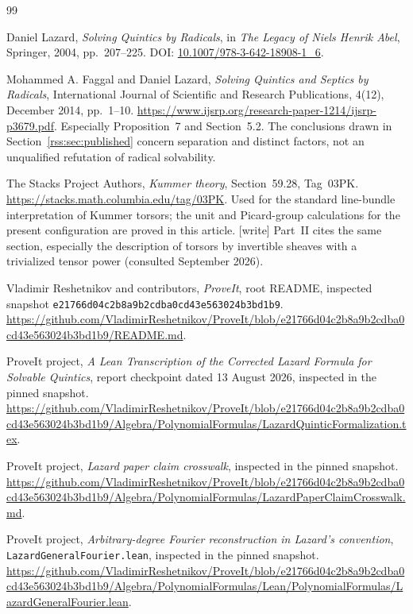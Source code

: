 \documentclass[11pt,a4paper]{article}
\theoremstyle{definition}
\theoremstyle{remark}
\newcommand{\code}[1]{{\small\nolinkurl{#1}}}
\newcommand{\snapshot}{\nolinkurl{e21766d04c2b8a9b2cdba0cd43e563024b3bd1b9}}
\begin{document}
\begin{thebibliography}{99}

Daniel Lazard,
\emph{Solving Quintics by Radicals},
in \emph{The Legacy of Niels Henrik Abel}, Springer, 2004, pp.~207--225.
DOI: \href{https://doi.org/10.1007/978-3-642-18908-1_6}{10.1007/978-3-642-18908-1\_6}.

Mohammed A. Faggal and Daniel Lazard,
\emph{Solving Quintics and Septics by Radicals},
International Journal of Scientific and Research Publications,
4(12), December 2014, pp.~1--10.
\url{https://www.ijsrp.org/research-paper-1214/ijsrp-p3679.pdf}.
Especially Proposition~7 and Section~5.2. The conclusions drawn in
Section~\ref{rss:sec:published} concern separation and distinct factors, not an
unqualified refutation of radical solvability.

The Stacks Project Authors,
\emph{Kummer theory}, Section~59.28, Tag~03PK.
\url{https://stacks.math.columbia.edu/tag/03PK}.
Used for the standard line-bundle interpretation of Kummer torsors; the
unit and Picard-group calculations for the present configuration are
proved in this article.
[write] Part~II cites the same section, especially the description of
torsors by invertible sheaves with a trivialized tensor power (consulted
September 2026).

Vladimir Reshetnikov and contributors,
\emph{ProveIt}, root README, inspected snapshot
\snapshot.
\url{https://github.com/VladimirReshetnikov/ProveIt/blob/e21766d04c2b8a9b2cdba0cd43e563024b3bd1b9/README.md}.

ProveIt project,
\emph{A Lean Transcription of the Corrected Lazard Formula for Solvable
Quintics}, report checkpoint dated 13 August 2026, inspected in the pinned
snapshot.
\url{https://github.com/VladimirReshetnikov/ProveIt/blob/e21766d04c2b8a9b2cdba0cd43e563024b3bd1b9/Algebra/PolynomialFormulas/LazardQuinticFormalization.tex}.

ProveIt project,
\emph{Lazard paper claim crosswalk}, inspected in the pinned snapshot.
\url{https://github.com/VladimirReshetnikov/ProveIt/blob/e21766d04c2b8a9b2cdba0cd43e563024b3bd1b9/Algebra/PolynomialFormulas/LazardPaperClaimCrosswalk.md}.

ProveIt project,
\emph{Arbitrary-degree Fourier reconstruction in Lazard's convention},
\code{LazardGeneralFourier.lean}, inspected in the pinned snapshot.
\url{https://github.com/VladimirReshetnikov/ProveIt/blob/e21766d04c2b8a9b2cdba0cd43e563024b3bd1b9/Algebra/PolynomialFormulas/Lean/PolynomialFormulas/LazardGeneralFourier.lean}.


\end{thebibliography}
\end{document}

